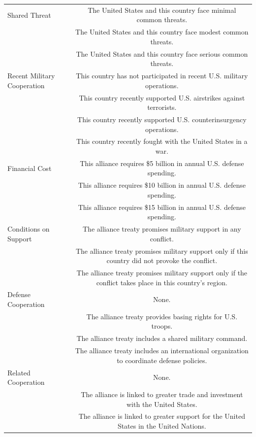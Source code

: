 \documentclass[12pt]{article}
\begin{document}
\begin{table}[htpb]
\begin{center}
\begin{adjustbox}{width = .85\textwidth}
\begin{tabular}{lc}
Shared Threat       & The United States and this country face minimal common threats. \\ 
                    & The United States and this country face modest common threats. \\
                    & The United States and this country face serious common threats. \\
                    
Recent Military Cooperation  & This country has not participated in recent U.S. military operations. \\ 
                    & This country recently supported U.S. airstrikes against terrorists. \\
                    & This country recently supported U.S. counterinsurgency operations. \\
                    & This country recently fought with the United States in a war. \\
                    
Financial Cost      & This alliance requires \$5 billion in annual U.S. defense spending.  \\ 
                    & This alliance requires \$10 billion in annual U.S. defense spending.  \\ 
                    & This alliance requires \$15 billion in annual U.S. defense spending.  \\ 
                    
Conditions on Support  & The alliance treaty promises military support in any conflict. \\ 
                    & The alliance treaty promises military support only if this country did not provoke the conflict. \\ 
                    & The alliance treaty promises military support only if the conflict takes place in this country's region. \\
                    
Defense Cooperation & None. \\ 
                    & The alliance treaty provides basing rights for U.S. troops. \\
                    & The alliance treaty includes a shared military command. \\
                    & The alliance treaty includes an international organization to coordinate defense policies.  \\ 
Related Cooperation & None. \\
                    & The alliance is linked to greater trade and investment with the United States. \\ 
                    & The alliance is linked to greater support for the United States in the United Nations. \\ 
                    

\end{tabular}
\end{adjustbox}
\end{center}
\end{table}
\end{document}
